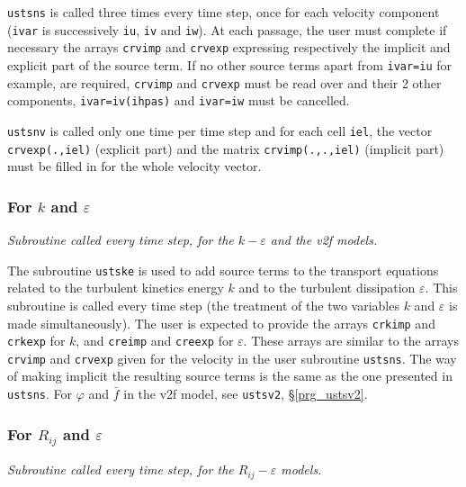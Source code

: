 {{{\texttt{ustsns} is called three times every time
step, once for each velocity component (\texttt{ivar} is successively
\texttt{iu}, \texttt{iv} and \texttt{iw}). At each passage, the user must complete 
if necessary the arrays \texttt{crvimp}
and \texttt{crvexp} expressing respectively the implicit and explicit part of
the source term. If no other source terms apart from \texttt{ivar=iu} for
example, are required, \texttt{crvimp} and \texttt{crvexp} must be read over and
their 2 other components, \texttt{ivar=iv(ihpas)} and \texttt{ivar=iw}
must be cancelled.

\texttt{ustsnv} is called only one time per time step and for each cell \texttt{iel}, 
the vector \texttt{crvexp(.,iel)} (explicit part) and the matrix \texttt{crvimp(.,.,iel)} 
(implicit part) must be filled in for the whole velocity vector.


\subsubsection{For $k$ and $\varepsilon$}

\noindent
\textit{Subroutine called every time step, for the $k-\varepsilon$ and
the v2f models.}

The subroutine \texttt{ustske} is used to add source terms to the transport equations
related to the turbulent kinetics energy $k$ and to the turbulent
dissipation $\varepsilon$.
This subroutine is called every time step (the
treatment of the two variables $k$ and $\varepsilon$ is made
simultaneously). The user is expected to provide the arrays \texttt{crkimp} and
\texttt{crkexp} for $k$, and \texttt{creimp} and \texttt{creexp} for
$\varepsilon$. These arrays are similar to the arrays \texttt{crvimp} and
\texttt{crvexp} given for the velocity in the user subroutine \texttt{ustsns}.
The way of making implicit the resulting source terms is the same as the one
presented in \texttt{ustsns}. For $\varphi$ and $\bar{f}$
in the v2f model, see \texttt{ustsv2}, \S\ref{prg_ustsv2}.

\subsubsection{For $R_{ij}$ and $\varepsilon$}

\noindent
\textit{Subroutine called every time step, for the $R_{ij}-\varepsilon$ models.}

}}}
